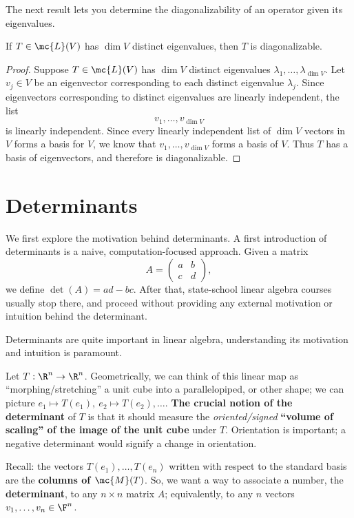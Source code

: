 \documentclass[math0540-lecture-notes.tex]{subfiles}
\begin{document}
The next result lets you determine the diagonalizability of an operator given its eigenvalues.
\begin{theorem}{}
  If $T\in \mc{L}(V)$ has $\dim{V}$ distinct eigenvalues, then $T$ is diagonalizable.
\end{theorem}
\begin{proof}[Proof]
  Suppose $T\in \mc{L}(V)$ has $\dim{V}$ distinct eigenvalues $\lambda_1,\ldots,\lambda_{\dim{V}}$.
  Let $v_j\in V$ be an eigenvector corresponding to each distinct eigenvalue $\lambda_j$. Since
  eigenvectors corresponding to distinct eigenvalues are linearly independent, the list \[
    v_1,\ldots,v_{\dim{V}}
  \] is linearly independent. Since every linearly independent list of $\dim{V}$ vectors in $V$
  forms a basis for $V$, we know that $v_1,\ldots,v_{\dim{V}}$ forms a basis of $V$. Thus $T$ has a
  basis of eigenvectors, and therefore is diagonalizable.
\end{proof}

\section{Determinants}

We first explore the motivation behind determinants. A first introduction of determinants is a
naive, computation-focused approach. Given a matrix \[
  A = \begin{pmatrix} a&b\\c&d \end{pmatrix} 
,\] we define $\det{(A)}=ad-bc$. After that, state-school linear algebra courses usually stop there,
and proceed without providing any external motivation or intuition behind the determinant.

Determinants are quite important in linear algebra, understanding its motivation and intuition is
paramount.

Let $T:\R^{n}\to \R^{n}$. Geometrically, we can think of this linear map as ``morphing/stretching''
a unit cube into a parallelopiped, or other shape; we can picture $e_1\mapsto T(e_1),\ e_2\mapsto
T(e_2),\ldots$. \textbf{The crucial notion of the determinant} of $T$ is that it should measure the
\textit{oriented/signed} \textbf{``volume of scaling'' of the image of the unit cube} under $T$.
Orientation is important; a negative determinant would signify a change in orientation.

Recall: the vectors $T(e_1),\ldots,T(e_n)$ written with respect to the standard basis are the
\textbf{columns of $\mc{M}(T)$}. So, we want a way to associate a number, the \textbf{determinant},
to any $n\times n$ matrix $A$; equivalently, to any $n$ vectors $v_1,\ldots,v_n\in \F^n$.
\end{document}
